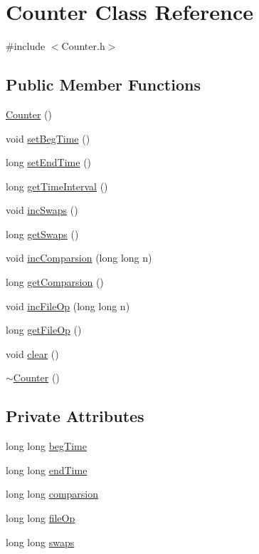 \hypertarget{class_counter}{}\section{Counter Class Reference}
\label{class_counter}


{\ttfamily \#include $<$Counter.\+h$>$}

\subsection*{Public Member Functions}
\begin{DoxyCompactItemize}
\item 
\hyperlink{class_counter_a1e05f69b5240fbab3e7ab351672167f0}{Counter} ()
\item 
void \hyperlink{class_counter_a71dea1262b81493aa9734f62a72b2691}{set\+Beg\+Time} ()
\item 
long \hyperlink{class_counter_a338ac4f04d6f5924aa7ace3b14d9ffb9}{set\+End\+Time} ()
\item 
long \hyperlink{class_counter_a25b1a1a6cd43fb23c2d1563d5b05aec6}{get\+Time\+Interval} ()
\item 
void \hyperlink{class_counter_aa0cd30379394257e44aa7afc84ed1fce}{inc\+Swaps} ()
\item 
long \hyperlink{class_counter_af20f10e30e8bd1d078d1d66c518a814c}{get\+Swaps} ()
\item 
void \hyperlink{class_counter_a224d93150c0fe2982d3efd7aa99668e6}{inc\+Comparsion} (long long n)
\item 
long \hyperlink{class_counter_a273aaa4592ef5fae6b7a90544d0ff6e0}{get\+Comparsion} ()
\item 
void \hyperlink{class_counter_a63310182709c321ad8fe8e78b81d12aa}{inc\+File\+Op} (long long n)
\item 
long \hyperlink{class_counter_ac0a53b0296d0eacca2a2391a12ae39c5}{get\+File\+Op} ()
\item 
void \hyperlink{class_counter_af66c74ac2bc69fa4f30c34377f869596}{clear} ()
\item 
\hyperlink{class_counter_a97f4728470ae8eff37d50ef1d6bb0135}{$\sim$\+Counter} ()
\end{DoxyCompactItemize}
\subsection*{Private Attributes}
\begin{DoxyCompactItemize}
\item 
long long \hyperlink{class_counter_ae2f8fa6947d7daa4b977d4aae2ee3c43}{beg\+Time}
\item 
long long \hyperlink{class_counter_a961ca391c9a8e3ac0efb8d6d61d734d4}{end\+Time}
\item 
long long \hyperlink{class_counter_a20f5a772c02412c338457dcc85c4a543}{comparsion}
\item 
long long \hyperlink{class_counter_abc197117fc99ab93bebc483059ae0fbc}{file\+Op}
\item 
long long \hyperlink{class_counter_a2a5ee961a25c6eb87d1ad02bcef4ade1}{swaps}
\end{DoxyCompactItemize}


